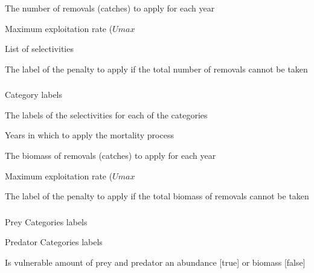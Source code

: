  {The number of removals (catches) to apply for each year}

 {Maximum exploitation rate ($Umax$}

 {List of selectivities}

 {The label of the penalty to apply if the total number of removals cannot be taken}

\subsubsection[Mortality Event Biomass]{}

 {Category labels}

 {The labels of the selectivities for each of the categories}

 {Years in which to apply the mortality process}

 {The biomass of removals (catches) to apply for each year}

 {Maximum exploitation rate ($Umax$}

 {The label of the penalty to apply if the total biomass of removals cannot be taken}

\subsubsection[Mortality Holling Rate]{}

 {Prey Categories labels}

 {Predator Categories labels}

 {Is vulnerable amount of prey and predator an abundance [true] or biomass [false]}


